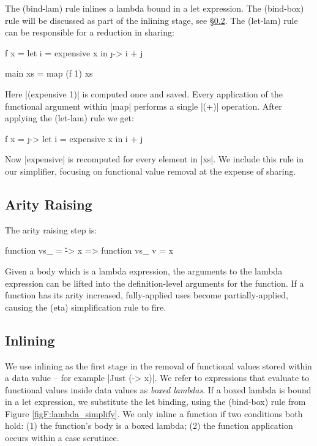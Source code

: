 The (bind-lam) rule inlines a lambda bound in a let expression. The (bind-box) rule will be discussed as part of the inlining stage, see \S\ref{secF:inlining}. The (let-lam) rule can be responsible for a reduction in sharing:

\begin{example}
\begin{code}
f x =  let  i = expensive x
       in   \j -> i + j

main xs = map (f 1) xs
\end{code}

Here |(expensive 1)| is computed once and saved. Every application of the functional argument within |map| performs a single |(+)| operation. After applying the (let-lam) rule we get:

\begin{code}
f x =  \j ->  let  i = expensive x
              in   i + j
\end{code}

Now |expensive| is recomputed for every element in |xs|. We include this rule in our simplifier, focusing on functional value removal at the expense of sharing.
\end{example}


\subsection{Arity Raising}

\begin{definition}
The arity raising step is:

\ignore\begin{code}
function vs_ = \v -> x
    => function vs_ v = x
\end{code}
\end{definition}

Given a body which is a lambda expression, the arguments to the lambda expression can be lifted into the definition-level arguments for the function. If a function has its arity increased, fully-applied uses become partially-applied, causing the (eta) simplification rule to fire.


\subsection{Inlining}
\label{secF:inlining}

We use inlining as the first stage in the removal of functional values stored within a data value -- for example |Just (\x -> x)|. We refer to expressions that evaluate to functional values inside data values as \textit{boxed lambdas}. If a boxed lambda is bound in a let expression, we substitute the let binding, using the (bind-box) rule from Figure \ref{figF:lambda_simplify}. We only inline a function if two conditions both hold: (1) the function's body is a boxed lambda; (2) the function application occurs within a case scrutinee.

